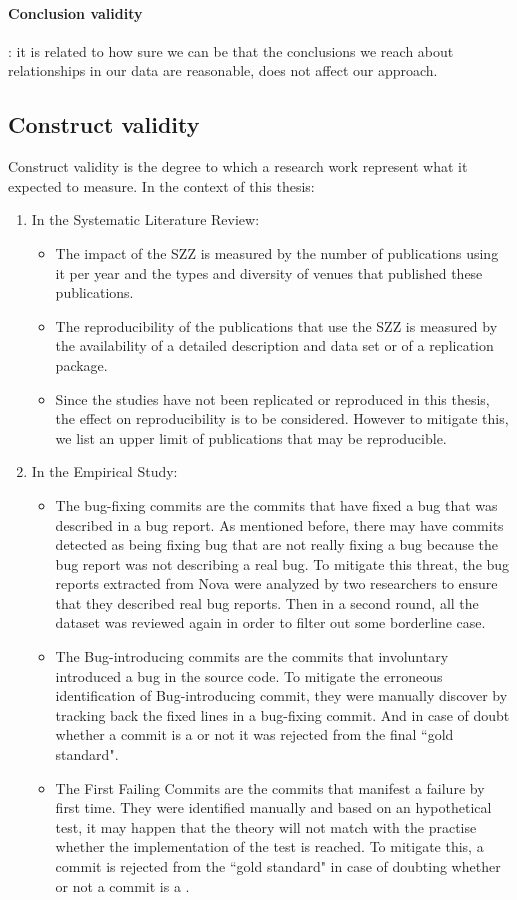 \documentclass[a4paper, 12pt]{book}
\begin{document}
 \paragraph{Conclusion validity}: it is related to how sure we can be that the conclusions we reach about relationships in our data are reasonable, does not affect our approach. 
 
\subsection{Construct validity}
Construct validity is the degree to which a research work represent what it expected to measure. In the context of this thesis: 

\begin{enumerate}
	\item In the Systematic Literature Review: 
		\begin{itemize}
			\item The impact of the SZZ is measured by the number of publications using it per year and the types and diversity of venues that published these publications.
			\item The reproducibility of the publications that use the SZZ is measured by the availability of a detailed description and data set or of a replication package.  
			\item Since the studies have not been replicated or reproduced in this thesis, the effect on reproducibility is to be considered. However to mitigate this, we list an upper limit of publications that may be reproducible.  
		\end{itemize}
	 \item In the Empirical Study: 
	 	\begin{itemize}
			\item The bug-fixing commits are the commits that have fixed a bug that was described in a bug report. As mentioned before, there may have commits detected as being fixing bug that are not really fixing a bug because the bug report was not describing a real bug. To mitigate this threat, the bug reports extracted from Nova were analyzed by two researchers to ensure that they described real bug reports. Then in a second round, all the dataset was reviewed again in order to filter out some borderline case. 
			\item The Bug-introducing commits are the commits that involuntary introduced a bug in the source code. To mitigate the erroneous identification of Bug-introducing commit, they were manually discover by tracking back the fixed lines in a bug-fixing commit. And in case of doubt whether a commit is a \BIC or not it was rejected from the final ``gold standard". 
			\item The First Failing Commits are the commits that manifest a failure by first time. They were identified manually and based on an hypothetical test, it may happen that the theory will not match with the practise whether the implementation of the test is reached. To mitigate this, a commit is rejected from the ``gold standard" in case of doubting whether or not a commit is a \FFC. 
		\end{itemize}
\end{enumerate}
\end{document}
